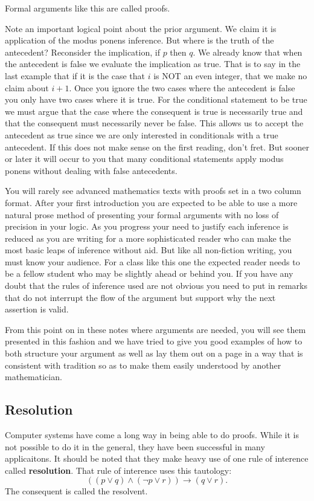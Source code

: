 Formal arguments like this are called proofs.

Note an important logical point about the prior argument. We claim it is application of the modus ponens inference. But where is the truth of the antecedent? Reconsider the implication, if $p$ then $q$. We already know that when the antecedent is false we evaluate the implication as true. That is to say in the last example that if it is the case that $i$ is NOT an even integer, that we make no claim about $i+1$. Once you ignore the two cases where the antecedent is false you only have two cases where it is true. For the conditional statement to be true we must argue that the case where the consequent is true is necessarily true and that the consequent must necessarily never be false. This allows us to accept the antecedent as true since we are only interested in conditionals with a true antecedent. If this does not make sense on the first reading, don't fret. But sooner or later it will occur to you that many conditional statements apply modus ponens without dealing with false antecedents. 

You will rarely see advanced mathematics texts with proofs set in a two column format. After your first introduction you are expected to be able to use a more natural prose method of presenting your formal arguments with no loss of precision in your logic. As you progress your need to justify each inference is reduced as you are writing for a more sophisticated reader who can make the most basic leaps of inference without aid. But like all non-fiction writing, you must know your audience. For a class like this one the expected reader needs to be a fellow student who may be slightly ahead or behind you. If you have any doubt that the rules of inference used are not obvious you need to put in remarks that do not interrupt the flow of the argument but support why the next assertion is valid.

From this point on in these notes where arguments are needed, you will see them presented in this fashion and we have tried to give you good examples of how to both structure your argument as well as lay them out on a page in a way that is consistent with tradition so as to make them easily understood by another mathematician. 

   \subsection {Resolution}
Computer systems have come a long way in being able to do proofs. While it is not possible to do it in the general, they have been successful in many applicaitons. It should be noted that they make heavy use of one rule of interence called \textbf{resolution}. That rule of interence uses this tautology:
$$((p \lor q) \land (\neg p \lor r)) \rightarrow (q \lor r).$$
The consequent is called the resolvent. 

